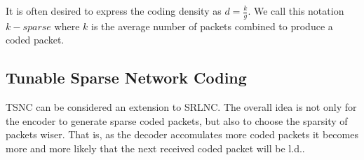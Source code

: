%

It is often desired to express the coding density as $d=\frac{k}{g}$. We call
this notation $k-sparse$ where $k$ is the average number of packets combined to
produce a coded packet.







%

\subsection{Tunable Sparse Network Coding}

\ac{TSNC} can be considered an extension to \ac{SRLNC}. The overall idea is
not only for the encoder to generate sparse coded packets, but also to
choose the sparsity of packets wiser. That is, as the decoder accomulates more
coded packets it becomes more and more likely that the next received
coded packet will be \ac{l.d.}.


